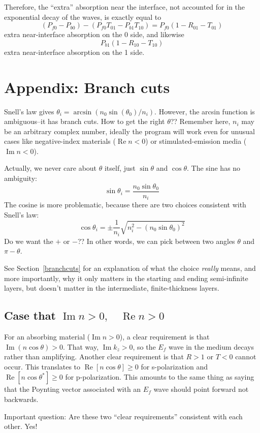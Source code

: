\documentclass[12pt]{article}
\renewcommand{\(}{\left(}
\renewcommand{\)}{\right)}
\renewcommand{\Im}{\operatorname{Im}}
\renewcommand{\Re}{\operatorname{Re}}
\begin{document}
Therefore, the ``extra'' absorption near the interface, not accounted for in the exponential decay of the waves, is exactly equal to
$$(P_{f0}-P_{b0}) - (P_{f0}T_{01} - P_{b1}T_{10}) = P_{f0}(1-R_{01}-T_{01})$$
extra near-interface absorption on the 0 side, and likewise
$$P_{b1}(1-R_{10}-T_{10})$$
extra near-interface absorption on the 1 side.

\section{Appendix: Branch cuts \label{appendixbranchcuts}}

Snell's law gives $\theta_i = \arcsin(n_0 \sin(\theta_0)/n_i)$. However, the arcsin function is ambiguous--it has branch cuts. How to get the right $\theta$?? Remember here, $n_i$ may be an arbitrary complex number, ideally the program will work even for unusual cases like negative-index materials ($\Re n <0$) or stimulated-emission media ($\Im n<0$).

Actually, we never care about $\theta$ itself, just $\sin \theta$ and $\cos \theta$. The sine has no ambiguity:
$$\sin \theta_i = \frac{n_0\sin \theta_0}{n_i}$$
The cosine is more problematic, because there are two choices consistent with Snell's law:
$$\cos \theta_i = \pm \frac{1}{n_i} \sqrt{n_i^2 - (n_0 \sin \theta_0)^2}$$
Do we want the $+$ or $-$?? In other words, we can pick between two angles $\theta$ and $\pi-\theta$.

See Section~\ref{branchcuts} for an explanation of what the choice \emph{really} means, and more importantly, why it only matters in the starting and ending semi-infinite layers, but doesn't matter in the intermediate, finite-thickness layers.

\subsection{Case that $\Im n>0, \quad \Re n > 0$}

For an absorbing material ($\Im n > 0$), a clear requirement is that $\Im(n \cos \theta)>0$. That way, $ \Im k_z > 0$, so the $E_f$ wave in the medium decays rather than amplifying. Another clear requirement is that $R>1$ or $T<0$ cannot occur. This translates to $\Re[n \cos\theta]\geq 0$ for s-polarization and $\Re[n \cos \theta^*]\geq 0$ for p-polarization. This amounts to the same thing as saying that the Poynting vector associated with an $E_f$ wave should point forward not backwards.

Important question: Are these two ``clear requirements'' consistent with each other. Yes!
\end{document}
